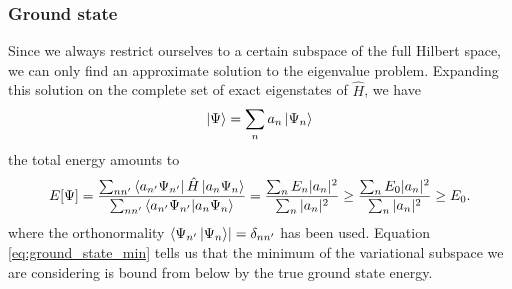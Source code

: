 \subsubsection{Ground state}
Since we always restrict ourselves to a certain subspace of the full Hilbert space, we can only find an approximate solution to the eigenvalue problem. Expanding this solution on the complete set of exact eigenstates of $\hat H$, we have
\begin{equation}
    \label{eq:expansion_gs}
    \ket\Psi = \sum_n a_n \ket{\Psi_n}    
\end{equation}
the total energy amounts to 
\begin{equation}
    \label{eq:ground_state_min}
    E[\Psi] = \frac{\sum_{nn'}\bra {a_{n'}\Psi_{n'}}\hat H \ket{a_n \Psi_n}}{\sum_{nn'}\bra{a_{n'}\Psi_{n'}}\ket{a_n\Psi_{n}}} = \frac{\sum_{n}E_n|a_n|^2}{\sum_n|a_n|^2}\ge \frac{\sum_{n}E_0|a_n|^2}{\sum_n|a_n|^2}\ge E_0.
\end{equation}
where the orthonormality $\bra{\Psi_{n'}\ket{\Psi_n}}=\delta_{nn'}$ has been used. Equation \eqref{eq:ground_state_min} tells us that the minimum of the variational subspace we are considering is bound from below by the true ground state energy.
